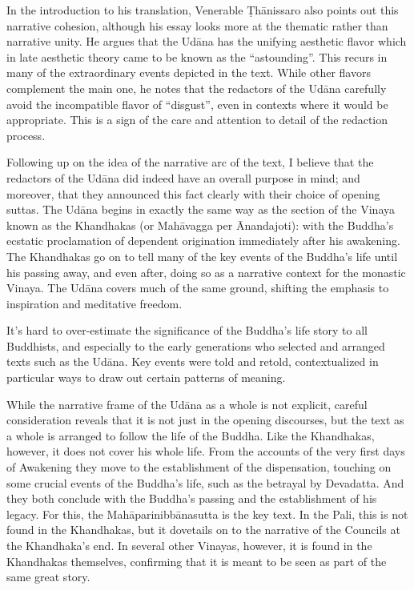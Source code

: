 \documentclass[12pt,openany]{book}%
\begin{document}
In the introduction to his translation, Venerable \textsanskrit{Ṭhānissaro} also points out this narrative cohesion, although his essay looks more at the thematic rather than narrative unity. He argues that the \textsanskrit{Udāna} has the unifying aesthetic flavor which in late aesthetic theory came to be known as the “astounding”. This recurs in many of the extraordinary events depicted in the text. While other flavors complement the main one, he notes that the redactors of the \textsanskrit{Udāna} carefully avoid the incompatible flavor of “disgust”, even in contexts where it would be appropriate. This is a sign of the care and attention to detail of the redaction process.

Following up on the idea of the narrative arc of the text, I believe that the redactors of the \textsanskrit{Udāna} did indeed have an overall purpose in mind; and moreover, that they announced this fact clearly with their choice of opening suttas. The \textsanskrit{Udāna} begins in exactly the same way as the section of the Vinaya known as the Khandhakas (or \textsanskrit{Mahāvagga} per Ānandajoti): with the Buddha’s ecstatic proclamation of dependent origination immediately after his awakening. The Khandhakas go on to tell many of the key events of the Buddha’s life until his passing away, and even after, doing so as a narrative context for the monastic Vinaya. The \textsanskrit{Udāna} covers much of the same ground, shifting the emphasis to inspiration and meditative freedom.

It’s hard to over-estimate the significance of the Buddha’s life story to all Buddhists, and especially to the early generations who selected and arranged texts such as the \textsanskrit{Udāna}. Key events were told and retold, contextualized in particular ways to draw out certain patterns of meaning.

While the narrative frame of the \textsanskrit{Udāna} as a whole is not explicit, careful consideration reveals that it is not just in the opening discourses, but the text as a whole is arranged to follow the life of the Buddha. Like the Khandhakas, however, it does not cover his whole life. From the accounts of the very first days of Awakening they move to the establishment of the dispensation, touching on some crucial events of the Buddha’s life, such as the betrayal by Devadatta. And they both conclude with the Buddha’s passing and the establishment of his legacy. For this, the \textsanskrit{Mahāparinibbānasutta} is the key text. In the Pali, this is not found in the Khandhakas, but it dovetails on to the narrative of the Councils at the Khandhaka’s end. In several other Vinayas, however, it is found in the Khandhakas themselves, confirming that it is meant to be seen as part of the same great story.
\end{document}
